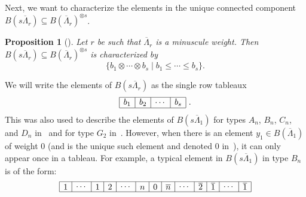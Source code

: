 \documentclass[reqno]{amsart}
\newcommand{\clfw}{\overline{\Lambda}} %
\newcommand{\bon}{\overline{1}}
\newcommand{\btw}{\overline{2}}
\newcommand{\bn}{\overline{n}}
\theoremstyle{plain}
\newtheorem{prop}[thm]{Proposition}
\theoremstyle{definition}
\numberwithin{equation}{section}
\begin{document}
Next, we want to characterize the elements in the unique connected component $B(s\clfw_r) \subseteq B(\clfw_r)^{\otimes s}$.

\begin{prop}[{\cite[Prop.~7.29]{Scrimshaw17}}]
\label{prop:minuscule_description}
Let $r$ be such that $\clfw_r$ is a minuscule weight. Then $B(s\clfw_r) \subseteq B(\clfw_r)^{\otimes s}$ is characterized by
\[
\{ b_1 \otimes \cdots \otimes b_s \mid b_1 \leq \cdots \leq b_s \}.
\]
\end{prop}

We will write the elements of $B(s\clfw_r)$ as the single row tableaux
\[
\begin{array}{|c|c|c|c|}
\hline b_1 & b_2 & \cdots & b_s
\\\hline 
\end{array}\ .
\]
This was also used to describe the elements of $B(s\clfw_1)$ for types $A_n$, $B_n$, $C_n$, and $D_n$ in~\cite{KN94} and for type $G_2$ in~\cite{KM94}.
However, when there is an element $y_1 \in B(\clfw_1)$ of weight $0$ (and is the unique such element and denoted $0$ in~\cite{KM94,KN94}), it can only appear once in a tableau.
For example, a typical element in $B(s\clfw_1)$ in type $B_n$ is of the form:
\[
\begin{array}{|c|c|c|c|c|c|c|c|c|c|c|c|c|}
\hline
\raisebox{-1pt}{$1$} & \cdots & \raisebox{-1pt}{$1$} & \raisebox{-1pt}{$2$} & \cdots & \raisebox{-1pt}{$n$} & \raisebox{-1pt}{$0$} & \raisebox{-1pt}{$\bn$} & \cdots & \raisebox{-1pt}{$\btw$} & \raisebox{-1pt}{$\bon$} & \cdots & \raisebox{-1pt}{$\bon$}
\\\hline
\end{array}
\]
\end{document}
